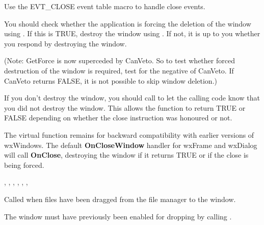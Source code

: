 Use the EVT\_CLOSE event table macro to handle close events.

You should check whether the application is forcing the deletion of the window
using . If this is TRUE,
destroy the window using .
If not, it is up to you whether you respond by destroying the window.

(Note: GetForce is now superceded by CanVeto. So to test whether forced destruction of
the window is required, test for the negative of CanVeto. If CanVeto returns FALSE,
it is not possible to skip window deletion.)

If you don't destroy the window, you should call  to
let the calling code know that you did not destroy the window. This allows the  function
to return TRUE or FALSE depending on whether the close instruction was honoured or not.


The  virtual function remains
for backward compatibility with earlier versions of wxWindows. The
default {\bf OnCloseWindow} handler for wxFrame and wxDialog will call {\bf OnClose},
destroying the window if it returns TRUE or if the close is being forced.


,\rtfsp
{},\rtfsp
{},\rtfsp
{},\rtfsp
{},\rtfsp
{},\rtfsp
{}

\label{wxwindowondropfiles}


Called when files have been dragged from the file manager to the window.




The window must have previously been enabled for dropping by calling
\rtfsp{}.

